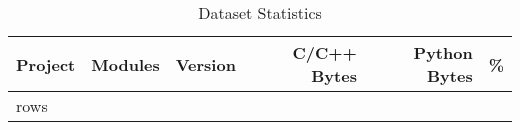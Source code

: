 \begin{table}[h]
\centering
\begin{tabular}{lrlrrr}
\hline
\textbf{Project} & \textbf{Modules} & \textbf{Version} & \textbf{C/C++ Bytes} & \textbf{Python Bytes} & \textbf{\%} \\
\hline
{rows}
\hline
\end{tabular}
\caption{Dataset Statistics}
\label{tab:dataset_stats}
\end{table}

